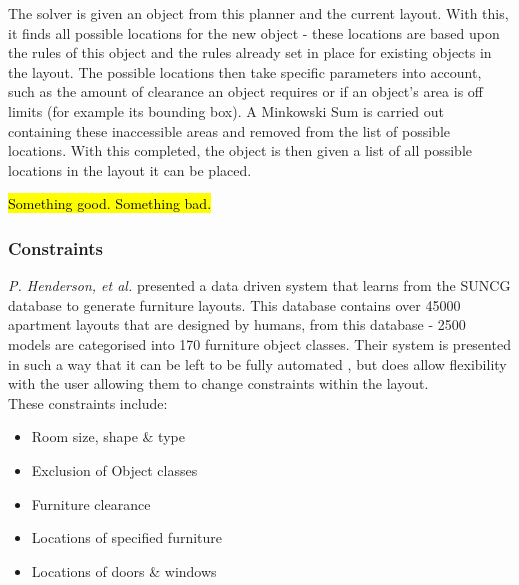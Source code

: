 The solver is given an object from this planner and the current layout. With this, it finds all possible locations for the new object - these locations are based upon the rules of this object and the rules already set in place for existing objects in the layout. 
The possible locations then take specific parameters into account, such as the amount of clearance an object requires or if an object's area is off limits (for example its bounding box)\cite{rule-based-layout}. A Minkowski Sum \cite{minkowski} is carried out containing these inaccessible areas and removed from the list of possible locations.
With this completed, the object is then given a list of all possible locations in the layout it can be placed.

\hl{Something good. Something bad.}

\bigskip
\subsubsection{Constraints}
\textit{P. Henderson, et al.} \cite{constrained-layouts} presented a data driven system that learns from the SUNCG \cite{suncg} database to generate furniture layouts. This database contains over 45000 apartment layouts that are designed by humans, from this database - 2500 models are categorised into 170 furniture object classes.
Their system is presented in such a way that it can be left to be fully automated \cite{constrained-layouts}, but does allow flexibility with the user allowing them to change constraints within the layout.\\
These constraints include:
\begin{itemize}
    \item Room size, shape \& type 
    \item Exclusion of Object classes
    \item Furniture clearance 
    \item Locations of specified furniture
    \item Locations of doors \& windows
\end{itemize}

